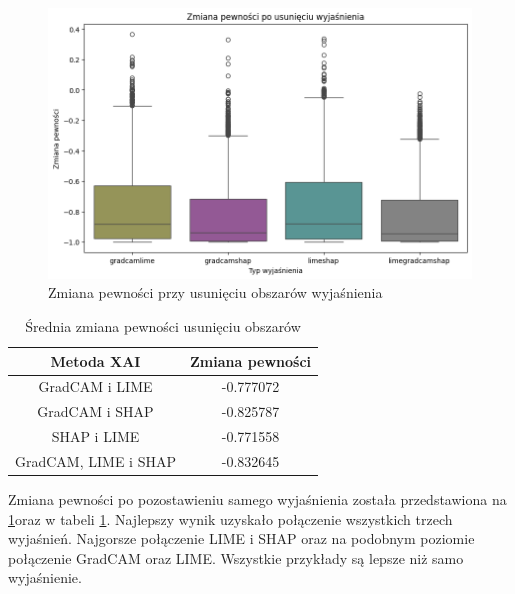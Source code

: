 \begin{figure}
	\centering\includegraphics[width=.6\textwidth]{img/combine_confidence_no_exp_or}
	\caption{Zmiana pewności przy usunięciu obszarów wyjaśnienia}  \label{rys:combineandconfidenceorno}
\end{figure}
\begin{table}
	\centering
	\begin{tabular}{|c|c|}
		\hline
		\textbf{Metoda XAI}  & Zmiana pewności \\
		\hline
		GradCAM i LIME       & -0.777072       \\
		\hline
		GradCAM i SHAP       & -0.825787       \\
		\hline
		SHAP i LIME          & -0.771558       \\
		\hline
		GradCAM, LIME i SHAP & -0.832645       \\
		\hline
	\end{tabular}
	\caption{Średnia zmiana pewności usunięciu obszarów}
	\label{tab:combineandconfidenceorno}
\end{table}
Zmiana pewności po pozostawieniu samego wyjaśnienia została przedstawiona na \ref{rys:combineandconfidenceorno}oraz w tabeli \ref{tab:combineandconfidenceorno}.
Najlepszy wynik uzyskało połączenie wszystkich trzech wyjaśnień.
Najgorsze połączenie LIME i SHAP oraz na podobnym poziomie połączenie GradCAM oraz LIME.
Wszystkie przykłady są lepsze niż samo wyjaśnienie.
